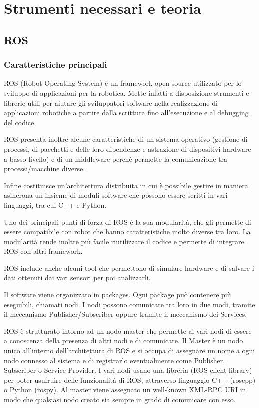 \documentclass[Lau, binding=0.6cm, oneside]{sapthesis}
\begin{document}
\chapter{Strumenti necessari e teoria}
\section{ROS}
\subsection{Caratteristiche principali}
ROS (Robot Operating System) è un framework open source utilizzato per lo sviluppo di applicazioni per la robotica.
Mette infatti a disposizione strumenti e librerie utili per aiutare gli sviluppatori software nella realizzazione di applicazioni robotiche a partire dalla scrittura fino all’esecuzione e al debugging del codice.

ROS presenta inoltre alcune caratteristiche di un sistema operativo (gestione di processi, di pacchetti e delle loro dipendenze e astrazione di dispositivi hardware a basso livello) e di un middleware perché permette la comunicazione tra processi/macchine diverse.

Infine costituisce un’architettura distribuita in cui è possibile gestire in maniera asincrona un insieme di moduli software che possono essere scritti in vari linguaggi, tra cui C++ e Python.

Uno dei principali punti di forza di ROS è la sua modularità, che gli permette di essere compatibile con robot che hanno caratteristiche molto diverse tra loro.
La modularità rende inoltre più facile riutilizzare il codice e permette di integrare ROS con altri framework.

ROS include anche alcuni tool che permettono di simulare hardware e di salvare i dati ottenuti dai vari sensori per poi analizzarli.

Il software viene organizzato in packages. Ogni package può contenere più eseguibili, chiamati nodi.
I nodi possono comunicare tra loro in due modi, tramite il meccanismo Publisher/Subscriber oppure tramite il meccanismo dei Services.

ROS è strutturato intorno ad un nodo master che permette ai vari nodi di essere a conoscenza della presenza di altri nodi e di comunicare.
Il Master è un nodo unico all’interno dell’architettura di ROS e si occupa di assegnare un nome a ogni nodo connesso al sistema e di registrarlo eventualmente come Publisher, Subscriber o Service Provider.
I vari nodi usano una libreria (ROS client library) per poter usufruire delle funzionalità di ROS, attraverso linguaggio C++ (roscpp) o Python (rospy).
Al master viene assegnato un well-known XML-RPC URI in modo che qualsiasi nodo creato sia sempre in grado di comunicare con esso.\cite{fonte3}
\end{document}
